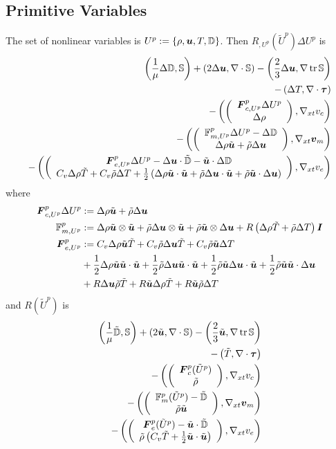 \documentclass{article}
\begin{document}
\subsection*{Primitive Variables}
The set of nonlinear variables is $U^p:=\left\{ \rho,\boldsymbol u,T,\mathbb{D} \right\}$.
Then $R_{,U^p}(\tilde U^p)\Delta U^p$ is
\label{eq:primitiveJacobian}
\begin{align*}
	\left( \frac{1}{\mu}\Delta\mathbb{D},\mathbb{S} \right)+\left( 2\Delta\boldsymbol u,\nabla\cdot\mathbb{S} \right)-\left( \frac{2}{3}\Delta\boldsymbol u,\nabla\operatorname*{tr}{\mathbb{S}} \right)\\
	-\left( \Delta T,\nabla\cdot\boldsymbol\tau \right)\\
	-\left( \left( \begin{array}{c} \boldsymbol F^p_{c,U^p}\Delta U^p\\ \Delta\rho\\ \end{array} \right),\nabla_{xt} v_c \right)\\
	-\left( \left( \begin{array}{c} \mathbb{F}^p_{m,U^p}\Delta U^p-\Delta\mathbb{D}\\ \Delta\rho\tilde{\boldsymbol u}+\tilde\rho\Delta\boldsymbol u\\ \end{array} \right),\nabla_{xt}\boldsymbol v_m \right)\\
	-\left( \left( \begin{array}{c} \boldsymbol F^p_{e,U^p}\Delta U^p-\Delta\boldsymbol u\cdot\tilde{\mathbb{D}}-\tilde{\boldsymbol u}\cdot\Delta\mathbb{D}\\ C_v\Delta\rho\tilde T+C_v\tilde\rho\Delta T
	+\frac{1}{2}\left( \Delta\rho\tilde{\boldsymbol u}\cdot\tilde{\boldsymbol u}+\tilde\rho\Delta\boldsymbol u\cdot\tilde{\boldsymbol u}+\tilde\rho\tilde{\boldsymbol u}\cdot\Delta\boldsymbol u \right)\\ \end{array} \right),\nabla_{xt} v_e \right)
\end{align*}
where
\begin{align*}
\boldsymbol F^p_{c,U^p}\Delta U^p&:=\Delta\rho\tilde{\boldsymbol u}+\tilde\rho\Delta\boldsymbol u\\
\mathbb{F}^p_{m,U^p}&:=\Delta\rho\tilde{\boldsymbol u}\otimes\tilde{\boldsymbol u}+\tilde\rho\Delta\boldsymbol u\otimes\tilde{\boldsymbol u}+\tilde\rho\tilde{\boldsymbol u}\otimes\Delta\boldsymbol u
+R\left( \Delta\rho\tilde T+\tilde\rho\Delta T \right)\boldsymbol I\\
\boldsymbol F^p_{e,U^p}&:=C_v\Delta\rho\tilde{\boldsymbol u}\tilde T+C_v\tilde\rho\Delta\boldsymbol u\tilde T+C_v\tilde\rho\tilde{\boldsymbol u}\Delta T\\
&+\frac{1}{2}\Delta\rho\tilde{\boldsymbol u}\tilde{\boldsymbol u}\cdot\tilde{\boldsymbol u}
+\frac{1}{2}\tilde\rho\Delta\boldsymbol u\tilde{\boldsymbol u}\cdot\tilde{\boldsymbol u}
+\frac{1}{2}\tilde\rho\tilde{\boldsymbol u}\Delta\boldsymbol u\cdot\tilde{\boldsymbol u}
+\frac{1}{2}\tilde\rho\tilde{\boldsymbol u}\tilde{\boldsymbol u}\cdot\Delta\boldsymbol u\\
&+R\Delta\boldsymbol u\tilde\rho\tilde T
+R\tilde{\boldsymbol u}\Delta\rho\tilde T
+R\tilde{\boldsymbol u}\tilde\rho\Delta T
\end{align*}
and $R(\tilde U^p)$ is
\begin{align*}
	\left( \frac{1}{\mu}\tilde{\mathbb{D}},\mathbb{S} \right)+\left( 2\tilde{\boldsymbol u},\nabla\cdot\mathbb{S} \right)-\left( \frac{2}{3}\tilde{\boldsymbol u},\nabla\operatorname*{tr}{\mathbb{S}} \right)\\
	-\left( \tilde T,\nabla\cdot\boldsymbol\tau \right)\\
	-\left( \left( \begin{array}{c} \boldsymbol F^p_c(\tilde U^p)\\ \tilde\rho\\ \end{array} \right),\nabla_{xt} v_c \right)\\
	-\left( \left( \begin{array}{c} \mathbb{F}^p_m(\tilde U^p)-\tilde{\mathbb{D}}\\ \tilde\rho\tilde{\boldsymbol u}\\ \end{array} \right),\nabla_{xt}\boldsymbol v_m \right)\\
	-\left( \left( \begin{array}{c} \boldsymbol F^p_e(\tilde U^p)-\tilde{\boldsymbol u}\cdot\tilde{\mathbb{D}}\\ \tilde\rho\left( C_v\tilde T+\frac{1}{2}\tilde{\boldsymbol u}\cdot\tilde{\boldsymbol u} \right)\\ \end{array} \right),\nabla_{xt} v_e \right)
\end{align*}
\end{document}
